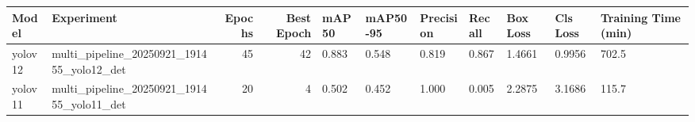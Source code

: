 \begin{tabular}{llrrlllllll}
\toprule
Model & Experiment & Epochs & Best Epoch & mAP50 & mAP50-95 & Precision & Recall & Box Loss & Cls Loss & Training Time (min) \\
\midrule
yolov12 & multi_pipeline_20250921_191455_yolo12_det & 45 & 42 & 0.883 & 0.548 & 0.819 & 0.867 & 1.4661 & 0.9956 & 702.5 \\
yolov11 & multi_pipeline_20250921_191455_yolo11_det & 20 & 4 & 0.502 & 0.452 & 1.000 & 0.005 & 2.2875 & 3.1686 & 115.7 \\
\bottomrule
\end{tabular}
